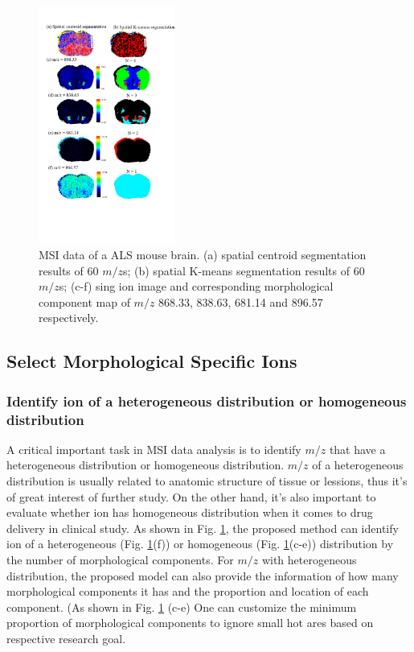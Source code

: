 \documentclass{bioinfo}
\begin{document}
\begin{figure}[b!]
    \centering
	\includegraphics[width=0.4\textwidth]{long_figure.jpg}
    \caption{ MSI data of a ALS mouse brain. (a) spatial centroid segmentation results of 60 $m/z$s; (b) spatial K-means segmentation results of 60 $m/z$s; (c-f) sing ion image and corresponding morphological component map of $m/z$ 868.33, 838.63, 681.14 and 896.57 respectively.}
    \label{fig:figure4}
\end{figure}



\subsection{Select Morphological Specific Ions}
\subsubsection{Identify ion of a heterogeneous distribution or homogeneous distribution}
A critical important task in MSI data analysis is to identify $m/z$ that have a heterogeneous distribution or homogeneous distribution. $m/z$ of a heterogeneous distribution is usually related to anatomic structure of tissue or lessions, thus it's of great interest of further study. On the other hand, it's also important to evaluate whether ion has homogeneous distribution when it comes to drug delivery in clinical study. As shown in Fig. \ref{fig:figure4}, the proposed method can identify ion of a heterogeneous (Fig. \ref{fig:figure4}(f)) or homogeneous (Fig. \ref{fig:figure4}(c-e)) distribution by the number of morphological components. For $m/z$ with heterogeneous distribution, the proposed model can also provide the information of how many morphological components it has and the proportion and location of each component. (As shown in Fig. \ref{fig:figure4} (c-e)  One can customize the minimum proportion of morphological components to ignore small hot ares based on respective research goal.
\end{document}
